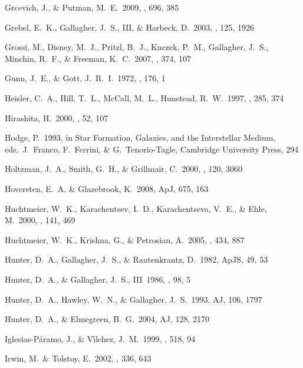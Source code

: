\documentclass[12pt,onecolumn]{emulateapj}
\begin{document}
\begin{thebibliography}{}
Grcevich, J., \& Putman, M.~E.\ 2009, \apj, 696, 385

Grebel, E.~K., Gallagher, J.~S., III, \& Harbeck, D.\ 2003, \aj, 125, 1926

Grossi, M., Disney, M.~J., Pritzl, B.~J., Knezek, P.~M., Gallagher, J.~S., 
Minchin, R.~F., \& Freeman, K.~C.\ 2007, \mnras, 374, 107 

Gunn, J.~E., \& Gott, J.~R.~I.\ 1972, \apj, 176, 1 

Heisler, C.~A., Hill, T.~L., McCall, M.~L., Hunstead, R.~W.\ 1997, \mnras , 285, 374

Hirashita, H.\ 2000, \pasj , 52, 107

Hodge, P.\ 1993, in Star Formation, Galaxies, and the Interstellar Medium,
eds.\ J.\ Franco, F.\ Ferrini, \& G.\ Tenorio-Tagle, Cambridge University Press, 294

Holtzman, J.~A., Smith, G.~H., \& Grillmair, C.\ 2000, \aj, 120, 3060 

Hoversten, E.~A. \& Glazebrook, K.\ 2008, ApJ, 675, 163 

Huchtmeier, W.~K., Karachentsev, I.~D., Karachentseva, V.~E., \& 
Ehle, M.\ 2000, \aaps, 141, 469 

Huchtmeier, W.~K., Krishna, G., \& Petrosian, A.\ 2005, \aap, 434, 887 

Hunter, D.~A., Gallagher, J.~S., \& Rautenkrantz, D.\ 1982, ApJS, 49, 53

Hunter, D.~A., \& Gallagher, J.~S., III\ 1986, \pasp, 98, 5 

Hunter, D.~A., Hawley, W.~N., \& Gallagher, J.~S.\ 1993, AJ, 106, 1797

Hunter, D.~A., \& Elmegreen, B.~G.\ 2004, AJ, 128, 2170

Iglesias-P{\'a}ramo, J., \& V{\'{\i}}lchez, J.~M.\ 1999, \apj, 518, 94 

Irwin, M.~\& Tolstoy, E.\ 2002, \mnras, 336, 643 


\end{thebibliography}
\end{document}
